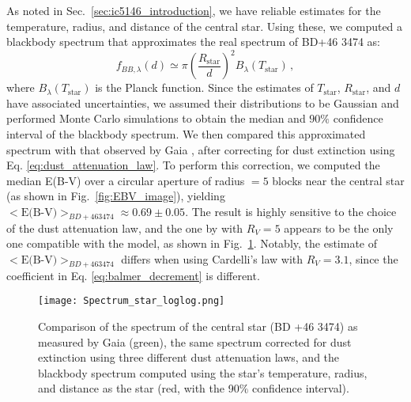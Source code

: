\documentclass[fleqn,usenatbib]{mnras}
\begin{document}
As noted in Sec.~\ref{sec:ic5146_introduction}, we have reliable estimates for the temperature, radius, and distance of the central star.
Using these, we computed a blackbody spectrum that approximates the real spectrum of BD+46 3474 as:
\begin{equation}
  f_{BB, \lambda} (d) \simeq \pi \left(\frac{R_\text{star}}{d}\right)^2 B_\lambda (T_\text{star}) \, ,
  \label{eq:blackbody_spectrum}
\end{equation}
where $B_\lambda (T_\text{star})$ is the Planck function.
Since the estimates of $T_\text{star}$, $R_\text{star}$, and $d$ have associated uncertainties, we assumed their distributions to be Gaussian and performed Monte Carlo simulations to obtain the median and $90\%$ confidence interval of the blackbody spectrum.
We then compared this approximated spectrum with that observed by Gaia \citep{Gaia_2023}, after correcting for dust extinction using Eq. \ref{eq:dust_attenuation_law}.
To perform this correction, we computed the median E(B-V) over a circular aperture of radius $= 5$ blocks near the central star (as shown in Fig.~\ref{fig:EBV_image}), yielding $<\text{E(B-V)}>_{BD+46 3474} \approx 0.69 \pm 0.05$.
The result is highly sensitive to the choice of the dust attenuation law, and the one by \cite{Cardelli_1989} with $R_V = 5$ appears to be the only one compatible with the model, as shown in Fig.~\ref{fig:Spectrum_star}.
Notably, the estimate of $<\text{E(B-V)}>_{BD+46 3474}$ differs when using Cardelli's law with $R_V = 3.1$, since the coefficient in Eq. \ref{eq:balmer_decrement} is different.

\begin{figure}\centering
	\texttt{[image: Spectrum\_star\_loglog.png]}
    \caption{Comparison of the spectrum of the central star (BD +46 3474) as measured by Gaia (green), the same spectrum corrected for dust extinction using three different dust attenuation laws, and the blackbody spectrum computed using the star's temperature, radius, and distance as the star (red, with the 90$\%$ confidence interval).}
    \label{fig:Spectrum_star}
\end{figure}
\end{document}
